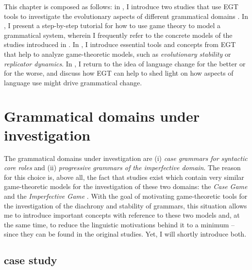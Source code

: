 \documentclass[output=paper,hidelinks]{langscibook}
\begin{document}
This chapter is composed as follows: in , I introduce two studies that use EGT tools to investigate the evolutionary aspects of different grammatical domains \citep{Jaeger07, Deo_2015}. In , I present a step-by-step tutorial for how to use game theory to model a grammatical system, wherein I frequently refer to the concrete models of the studies introduced in . In , I introduce essential tools and concepts from EGT that help to analyze game-theoretic models, such as \emph{evolutionary stability} or \emph{replicator dynamics}. In , I return to the idea of language change for the better or for the worse, and discuss how EGT can help to shed light on how aspects of language use might drive grammatical change.


\section{Grammatical domains under investigation}
\label{sec-domains}

The grammatical domains under investigation are (i) \emph{case grammars for syntactic core roles} and (ii) \emph{progressive grammars of the imperfective domain}. The reason for this choice is, above all, the fact that studies exist which contain very similar game-theoretic models for the investigation of these two domains: the \emph{Case Game} \citep{Jaeger07} and the \emph{Imperfective Game} \citep{Deo_2015}.  With the goal of motivating game-theoretic tools for the investigation of the diachrony and stability of grammars, this situation allows me to introduce important concepts with reference to these two models and, at the same time, to reduce the linguistic motivations behind it to a minimum -- since they can be found in the original studies. Yet, I will shortly introduce both.


\subsection{ case study}
\label{sec:intro:case}
\end{document}
